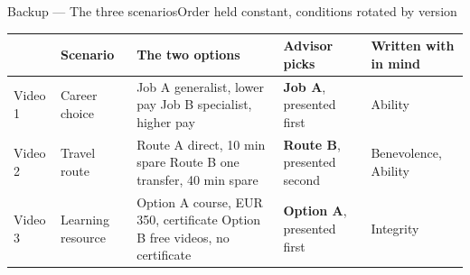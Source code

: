 \documentclass[aspectratio=169,10pt]{beamer}
\newcommand{\hl}[1]{{\color{knblue}\textbf{#1}}}
\newcommand{\rowrule}{\noalign{\vskip1pt}\arrayrulecolor{black!12}\hline\arrayrulecolor{black}\noalign{\vskip1pt}}
\begin{document}
\begin{frame}{Backup — The three scenarios}{Order held constant, conditions rotated by version}
  \vspace{-0.3em}
  {\centering\scriptsize
  \setlength{\tabcolsep}{4pt}\renewcommand{\arraystretch}{1.12}
  \begin{tabular}{@{}>{\raggedright\arraybackslash}m{}>{\raggedright\arraybackslash}m{}>{\raggedright\arraybackslash}m{}>{\raggedright\arraybackslash}m{}>{\raggedright\arraybackslash}m{}@{}}
    \toprule
    & \textbf{Scenario} & \textbf{The two options} & \textbf{Advisor picks} & \textbf{Written with in mind} \\
    \midrule
    Video 1 & Career choice    & Job A generalist, lower pay \newline Job B specialist, higher pay      & \hl{Job A}, presented first    & Ability \\
    \rowrule
    Video 2 & Travel route     & Route A direct, 10 min spare \newline Route B one transfer, 40 min spare & \hl{Route B}, presented second  & Benevolence, Ability \\
    \rowrule
    Video 3 & Learning resource & Option A course, EUR 350, certificate \newline Option B free videos, no certificate & \hl{Option A}, presented first & Integrity \\
    \bottomrule
  \end{tabular}\par}
  \vspace{0.6em}


\end{frame}
\end{document}
